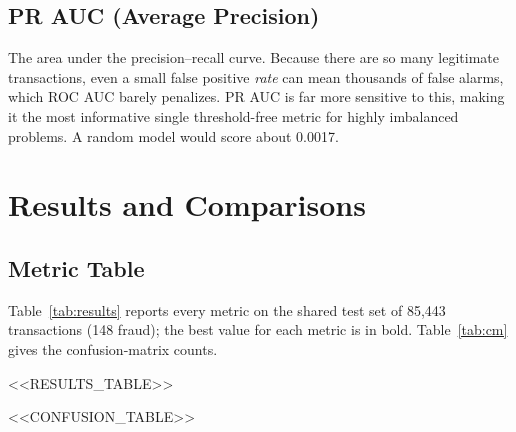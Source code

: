 \documentclass[journal]{IEEEtran}
\begin{document}
\subsection{PR AUC (Average Precision)}
The area under the precision--recall curve. Because there are so many legitimate transactions, even a small false positive \emph{rate} can mean thousands of false alarms, which ROC AUC barely penalizes. PR AUC is far more sensitive to this, making it the most informative single threshold-free metric for highly imbalanced problems. A random model would score about 0.0017.

\section{Results and Comparisons}
\subsection{Metric Table}
Table~\ref{tab:results} reports every metric on the shared test set of 85,443 transactions (148 fraud); the best value for each metric is in bold. Table~\ref{tab:cm} gives the confusion-matrix counts.

<<RESULTS_TABLE>>

<<CONFUSION_TABLE>>
\end{document}
